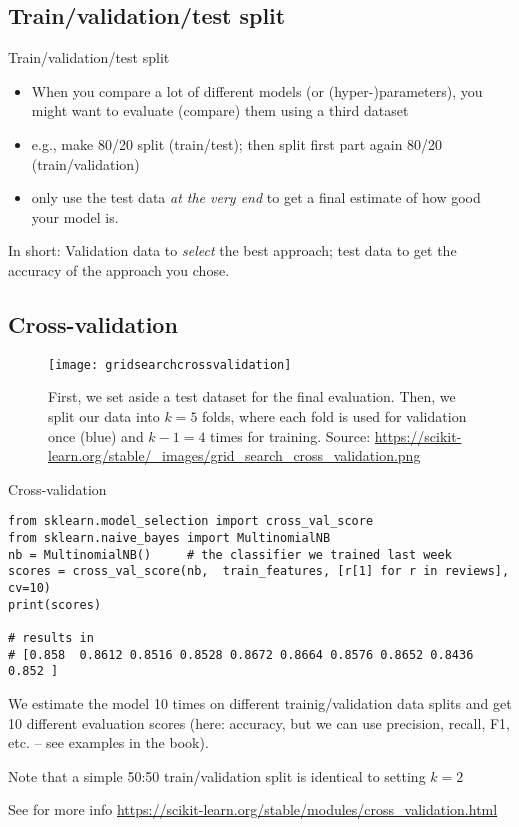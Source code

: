\subsection{Train/validation/test split}

\begin{frame}{Train/validation/test split}
\begin{itemize}
	\item When you compare a lot of different models (or (hyper-)parameters), you might want to evaluate (compare) them using a third dataset 
	\item e.g., make 80/20 split (train/test); then split first part again 80/20 (train/validation)
	\item only use the test data \emph{at the very end} to get a final estimate of how good your model is.
\end{itemize}
\pause
In short: Validation data to \emph{select} the best approach; test data to get the accuracy of the approach you chose.
\end{frame}

\subsection{Cross-validation}



\begin{frame}[plain]
	
	\begin{figure}
		\centering
		\texttt{[image: gridsearchcrossvalidation]}
		\caption{First, we set aside a test dataset for the final evaluation. Then, we split our data into $k=5$ folds, where each fold is used for validation once (blue) and $k-1=4$ times for training.
			\tiny Source: \url{https://scikit-learn.org/stable/_images/grid_search_cross_validation.png}}
		\label{fig:crossval}
	\end{figure}
\end{frame}



\begin{frame}[fragile]{Cross-validation}
\begin{verbatim}
from sklearn.model_selection import cross_val_score
from sklearn.naive_bayes import MultinomialNB
nb = MultinomialNB()     # the classifier we trained last week
scores = cross_val_score(nb,  train_features, [r[1] for r in reviews], cv=10)
print(scores)

# results in
# [0.858  0.8612 0.8516 0.8528 0.8672 0.8664 0.8576 0.8652 0.8436 0.852 ]
\end{verbatim}

We estimate the model 10 times on different trainig/validation data splits and get 10 different evaluation scores (here: accuracy, but we can use precision, recall, F1, etc. -- see examples in the book).

Note that a simple 50:50 train/validation split is identical to setting $k=2$ 

{\tiny See for more info
	\url{https://scikit-learn.org/stable/modules/cross\_validation.html}}
\end{frame}



